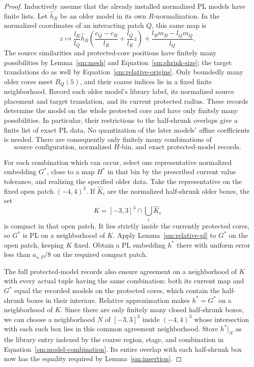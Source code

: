 \documentclass[11pt]{article}
\numberwithin{equation}{section}
\theoremstyle{definition}
\theoremstyle{remark}
\begin{document}
\begin{proof}
Inductively assume that the already installed normalized PL models
have finite lists.  Let $\widehat h_R$ be an older model in its own
$R$-normalization.  In the normalized coordinates of an interacting
patch $Q$, this same map is
\begin{equation}
 \label{sm:transported-model}
 z\longmapsto
 \frac{l_R}{l_Q}\widehat h_R\!\left(
       \frac{c_Q-c_R}{l_R}+\frac{l_Q}{l_R}z\right)
       +\frac{l_Rm_R-l_Qm_Q}{l_Q}.
\end{equation}
The source similarities and protected-core positions have finitely
many possibilities by Lemma~\ref{sm:mesh} and
Equation~\eqref{sm:shrink-size}; the target translations do as well
by Equation~\eqref{sm:relative-origins}.  Only boundedly many older
cores meet $B_Q(5)$, and their coarse indices lie in a fixed finite
neighborhood.  Record each older model's library label, its
normalized source placement and target translation, and its current
protected radius.  These records determine the model on the whole
protected core and have only finitely many possibilities.  In
particular, their restrictions to the half-shrunk overlaps give a
finite list of exact PL data.  No quantization of the later models'
affine coefficients is needed.  There are consequently only finitely
many combinations of
\begin{equation}
 \label{sm:model-combination}
 \text{source configuration, normalized }H\text{-bin,
 and exact protected-model records}.
\end{equation}

For each combination which can occur, select one
representative normalized embedding $G^*$, close
to a map $H^*$ in that bin by the prescribed
current value tolerance, and realizing the
specified older data.  Take the representative
on the fixed open patch $(-4,4)^3$.  If
$\widehat K_i$ are the normalized half-shrunk
older boxes, the set
\[
 K=[-3,3]^3\cap\bigcup_i\widehat K_i
\]
is compact in that open patch.  It lies
strictly inside the currently protected
cores, so $G^*$ is PL on a neighborhood of
$K$.  Apply Lemma~\ref{sm:relative-pl} to
$G^*$ on the open patch, keeping $K$ fixed.
Obtain a PL embedding $h^*$ there with
uniform error less than $a_{s,P}/8$ on the
required compact patch.

The full protected-model records also ensure agreement on a
neighborhood of $K$ with every actual tuple having the same
combination: both its current map and $G^*$ equal the recorded
models on the protected cores, which contain the half-shrunk
boxes in their interiors.  Relative approximation makes $h^*=G^*$
on a neighborhood of $K$.  Since there are only finitely many
closed half-shrunk boxes, we can choose a neighborhood $N$ of
$[-3,3]^3$ inside $(-4,4)^3$ whose intersection with each such box
lies in this common agreement neighborhood.  Store $h^*|_N$ as the library
entry indexed by the coarse region, stage, and combination in
Equation~\eqref{sm:model-combination}.  Its entire overlap with
each half-shrunk box now has the equality required by
Lemma~\ref{sm:insertion}.


\end{proof}
\end{document}

